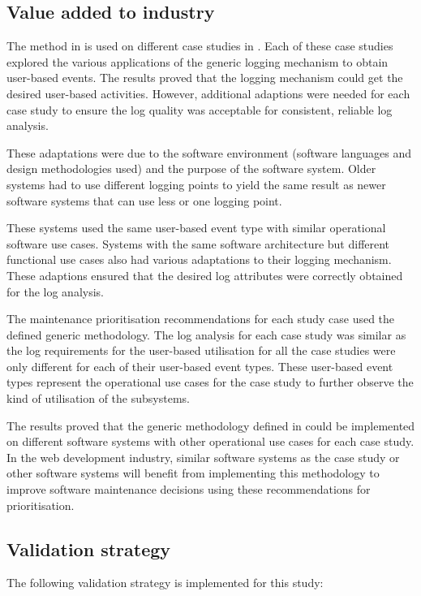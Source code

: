 \subsection{Value added to industry}
The method in  is used on different case studies in . Each of these case studies explored the various applications of the generic logging mechanism to obtain user-based events. The results proved that the logging mechanism could get the desired user-based activities. However, additional adaptions were needed for each case study to ensure the log quality was acceptable for consistent, reliable log analysis.\par These adaptations were due to the software environment (software languages and design methodologies used) and the purpose of the software system. Older systems had to use different logging points to yield the same result as newer software systems that can use less or one logging point.\par These systems used the same user-based event type with similar operational software use cases. Systems with the same software architecture but different functional use cases also had various adaptations to their logging mechanism. These adaptions ensured that the desired log attributes were correctly obtained for the log analysis. \par The maintenance prioritisation recommendations for each study case used the defined generic methodology. The log analysis for each case study was similar as the log requirements for the user-based utilisation for all the case studies were only different for each of their user-based event types. These user-based event types represent the operational use cases for the case study to further observe the kind of utilisation of the subsystems. \par The results proved that the generic methodology defined in  could be implemented on different software systems with other operational use cases for each case study. In the web development industry, similar software systems as the case study or other software systems will benefit from implementing this methodology to improve software maintenance decisions using these recommendations for prioritisation.

\subsection{Validation strategy}
The following validation strategy is implemented for this study:

